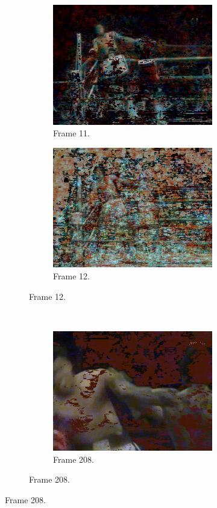 \documentclass[11pt,a4paper]{article}
\begin{document}
\def\wid{0.48}
\def\scal{0.55}
\begin{figure}[h]
  \centering
  \begin{subfigure}[]{\wid\textwidth}
    \begin{subfigure}[]{\wid\textwidth}
      \centering
      \includegraphics[keepaspectratio=true, scale=\scal]{Imgs/MuhammadAli/frame-11}
      \caption{Frame 11.}
    \end{subfigure}
    
    \begin{subfigure}[]{\wid\textwidth}
      \centering
      \includegraphics[keepaspectratio=true, scale=\scal]{Imgs/MuhammadAli/frame-12}
      \caption{Frame 12.}
    \end{subfigure}
  \end{subfigure}
  ~
  \begin{subfigure}[]{\wid\textwidth}
    \begin{subfigure}[]{\wid\textwidth}
      \centering
      \includegraphics[keepaspectratio=true, scale=\scal]{Imgs/MuhammadAli/frame-208}
      \caption{Frame 208.}
    \end{subfigure}
    

\end{subfigure}
\end{figure}
\end{document}
